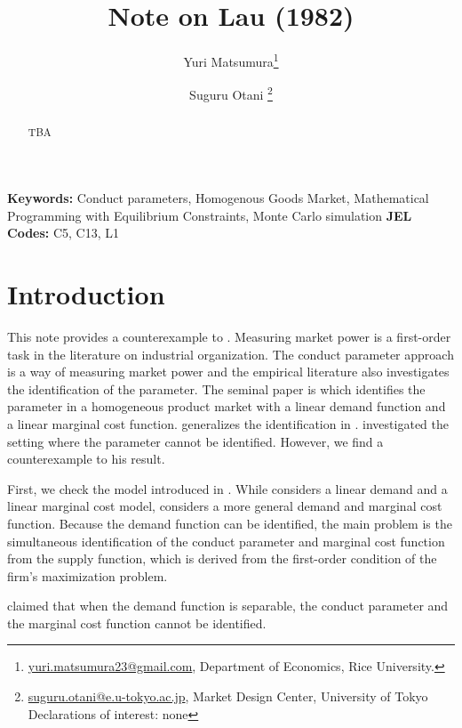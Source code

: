 \documentclass[11pt, a4paper]{article}
\title{Note on Lau (1982)}
\author{Yuri Matsumura\thanks{\href{mailto:}{yuri.matsumura23@gmail.com}, Department of Economics, Rice University.} \and Suguru Otani \thanks{\href{mailto:}{suguru.otani@e.u-tokyo.ac.jp}, Market Design Center, University of Tokyo
\\Declarations of interest: none %
}}
\theoremstyle{remark}
\begin{document}
\maketitle
\begin{abstract}
    TBA
\end{abstract}

\noindent\textbf{Keywords:} Conduct parameters, Homogenous Goods Market, Mathematical Programming with Equilibrium Constraints, Monte Carlo simulation
\vspace{0in}
\newline
\noindent\textbf{JEL Codes:} C5, C13, L1

\bigskip

\section{Introduction}
This note provides a counterexample to \citet{lau1982identifying}.
Measuring market power is a first-order task in the literature on industrial organization.
The conduct parameter approach is a way of measuring market power and the empirical literature also investigates the identification of the parameter.
The seminal paper is \citet{bresnahan1982oligopoly} which identifies the parameter in a homogeneous product market with a linear demand function and a linear marginal cost function.
\citet{lau1982identifying} generalizes the identification in \citet{bresnahan1982oligopoly}.
\citet{lau1982identifying} investigated the setting where the parameter cannot be identified.
However, we find a counterexample to his result. 

First, we check the model introduced in \citet{lau1982identifying}.
While \citet{bresnahan1982oligopoly} considers a linear demand and a linear marginal cost model, \citet{lau1982identifying} considers a more general demand and marginal cost function.
Because the demand function can be identified, the main problem is the simultaneous identification of the conduct parameter and marginal cost function from the supply function, which is derived from the first-order condition of the firm's maximization problem. 

\citet{lau1982identifying} claimed that when the demand function is separable, the conduct parameter and the marginal cost function cannot be identified.
\end{document}
